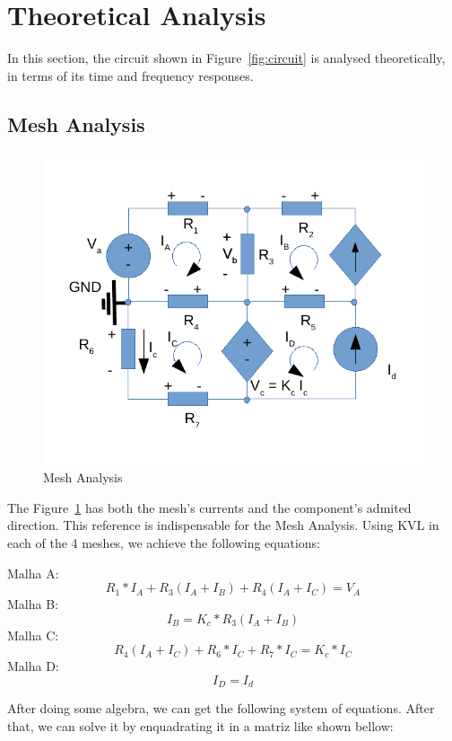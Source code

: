 \section{Theoretical Analysis}
\label{sec:analysis}

In this section, the circuit shown in Figure~\ref{fig:circuit} is analysed
theoretically, in terms of its time and frequency responses.

\subsection{Mesh Analysis}

\begin{figure}[h!] \centering
	\includegraphics[width=0.6\linewidth]{circ_mesh.pdf}
	\caption{Mesh Analysis}
	\label{fig:circuitMesh}
\end{figure}

The Figure~\ref{fig:circuitMesh} has both the mesh's currents and the 
component's admited direction.
This reference is indispensable for the Mesh Analysis.
Using KVL in each of the 4 meshes, we achieve the following equations:
\vspace{0.5cm}

Malha A:
$$ R_1 * I_A + R_3(I_A+I_B) + R_4(I_A+I_C) = V_A$$
Malha B:
$$ I_B = K_c * R_3(I_A + I_B) $$
Malha C:
$$ R_4(I_A + I_C) + R_6 * I_C + R_7 * I_C = K_c * I_C $$
Malha D:
$$ I_D = I_d $$

\vspace{0.5cm}

After doing some algebra, we can get the following system of equations. After that, 
we can solve it by enquadrating it in a matriz like shown bellow:

\vspace{0.5cm}

